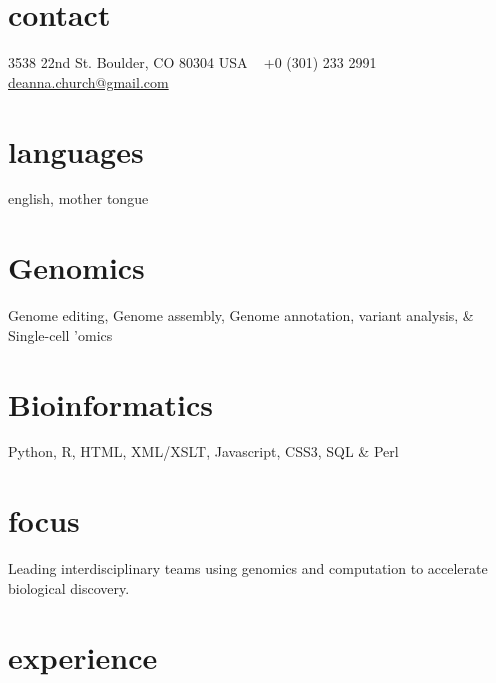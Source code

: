 \documentclass[]{dmc-cv} %
\begin{document}


\begin{aside} %
\section{contact}
3538 22nd St.
Boulder, CO 80304
USA
~
+0 (301) 233 2991
~
\href{mailto:deanna.church@gmail.com}{deanna.church@gmail.com}
\section{languages}
english, mother tongue
\section{Genomics}
Genome editing,
Genome assembly,
Genome annotation,
variant analysis, \&
Single-cell 'omics
\section{Bioinformatics}
Python, R,
HTML, XML/XSLT, Javascript,
CSS3, SQL \& Perl
\end{aside}

\section{focus}
Leading interdisciplinary teams using genomics and computation to accelerate biological discovery.


\section{experience}
\end{document}
